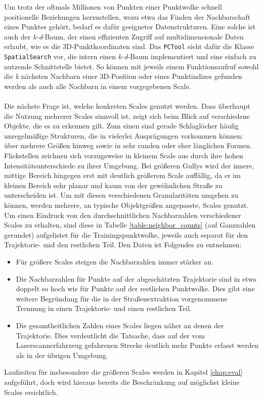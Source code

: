 Um trotz der oftmals Millionen von Punkten einer Punktwolke schnell positionelle Beziehungen herzustellen, wozu etwa das Finden der Nachbarschaft eines Punktes gehört, bedarf es dafür geeigneter Datenstrukturen. Eine solche ist auch der \textit{k-d}-Baum, der einen effizienten Zugriff auf multidimensionale Daten erlaubt, wie es die 3D-Punktkoordinaten sind. Das \texttt{PCTool} sieht dafür die Klasse \texttt{SpatialSearch} vor, die intern einen \textit{k-d}-Baum implementiert und eine einfach zu nutzende Schnittstelle bietet. So können mit jeweils einem Funktionsaufruf sowohl die \textit{k} nächsten Nachbarn einer 3D-Position oder eines Punktindizes gefunden werden als auch alle Nachbarn in einem vorgegebenen Scale. \\\\
Die nächste Frage ist, welche konkreten Scales genutzt werden. Dass überhaupt die Nutzung mehrerer Scales sinnvoll ist, zeigt sich beim Blick auf verschiedene Objekte, die es zu erkennen gilt. Zum einen sind gerade Schlaglöcher häufig unregelmäßige Strukturen, die in vielerlei Ausprägungen vorkommen können: über mehrere Größen hinweg sowie in sehr runden oder eher länglichen Formen. Flickstellen zeichnen sich vorzugsweise in kleinem Scale aus durch ihre hohen Intensitätsunterschiede zu ihrer Umgebung. Bei größeren Gullys wird der innere, mittige Bereich hingegen erst mit deutlich größerem Scale auffällig, da er im kleinen Bereich sehr planar und kaum von der gewöhnlichen Straße zu unterscheiden ist. Um mit diesen verschiedenen Granularitäten umgehen zu können, werden mehrere, an typische Objektgrößen angepasste, Scales genutzt. \\
Um einen Eindruck von den durchschnittlichen Nachbarzahlen verschiedener Scales zu erhalten, sind diese in Tabelle \ref{table:neighbor_counts} (auf Ganzzahlen gerundet) aufgelistet für die Trainingspunktwolke, jeweils auch separat für den Trajektorie- und den restlichen Teil. Den Daten ist Folgendes zu entnehmen:
\begin{itemize}
    \item Für größere Scales steigen die Nachbarzahlen immer stärker an.
    \item Die Nachbarzahlen für Punkte auf der abgeschätzten Trajektorie sind in etwa doppelt so hoch wie für Punkte auf der restlichen Punktwolke. Dies gibt eine weitere Begründung für die in der Straßenextraktion vorgenommene Trennung in einen Trajektorie- und einen restlichen Teil.
    \item Die gesamtheitlichen Zahlen eines Scales liegen näher an denen der Trajektorie. Dies verdeutlicht die Tatsache, dass auf der vom Laserscannerfahrzeug gefahrenen Strecke deutlich mehr Punkte erfasst werden als in der übrigen Umgebung.
\end{itemize}
Laufzeiten für insbesondere die größeren Scales werden in Kapitel \ref{chap:eval} aufgeführt, doch wird hieraus bereits die Beschränkung auf möglichst kleine Scales ersichtlich.

